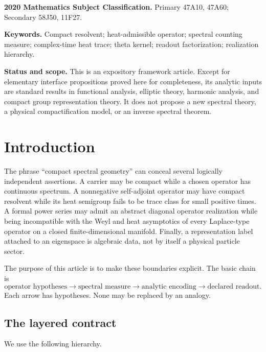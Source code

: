 \documentclass[11pt,a4paper]{article}
\theoremstyle{definition}
\theoremstyle{remark}
\begin{document}
\noindent\textbf{2020 Mathematics Subject Classification.}
Primary 47A10, 47A60; Secondary 58J50, 11F27.

\noindent\textbf{Keywords.}
Compact resolvent; heat-admissible operator; spectral counting measure;
complex-time heat trace; theta kernel; readout factorization; realization
hierarchy.

\vspace{0.25cm}
\noindent\textbf{Status and scope.}
This is an expository framework article. Except for elementary interface
propositions proved here for completeness, its analytic inputs are standard
results in functional analysis, elliptic theory, harmonic analysis, and compact
group representation theory. It does not propose a new spectral theory, a
physical compactification model, or an inverse spectral theorem.

\section{Introduction}

The phrase ``compact spectral geometry'' can conceal several logically
independent assertions. A carrier may be compact while a chosen operator has
continuous spectrum. A nonnegative self-adjoint operator may have compact
resolvent while its heat semigroup fails to be trace class for small positive
times. A formal power series may admit an abstract diagonal operator realization
while being incompatible with the Weyl and heat asymptotics of every
Laplace-type operator on a closed finite-dimensional manifold. Finally, a
representation label attached to an eigenspace is algebraic data, not by itself
a physical particle sector.

The purpose of this article is to make these boundaries explicit. The basic
chain is
\[
\boxed{
\text{operator hypotheses}
\longrightarrow
\text{spectral measure}
\longrightarrow
\text{analytic encoding}
\longrightarrow
\text{declared readout}.
}
\]
Each arrow has hypotheses. None may be replaced by an analogy.

\subsection{The layered contract}

We use the following hierarchy.
\end{document}
